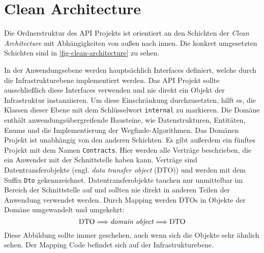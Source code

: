 \part{Clean Architecture}
Die Ordnerstruktur des API Projekts ist orientiert an den Schichten
der \textit{Clean Architecture}
mit Abhän\-gigkeiten von außen nach innen. Die konkret umgesetzten Schichten
sind in \autoref{fig-clean-architecture} zu sehen.



\noindent
In der Anwendungsebene werden hauptsächlich Interfaces definiert, welche
durch die Infrastrukturebene implementiert werden. Das API Projekt
sollte ausschließlich diese Interfaces verwenden und nie direkt
ein Objekt der Infrastruktur instanziieren.
Um diese Einschränkung durchzusetzten, hilft es,
die Klassen dieser Ebene mit dem Schlüsselwort \texttt{internal} zu markieren.
Die Domäne enthält anwendungsübergreifende Bausteine, wie
Datenstrukturen, Entitäten, Enums und die Implementierung der Wegfinde-Algorith\-men.
Das Domänen Projekt ist unabhängig von den anderen Schichten.
Es gibt außerdem ein fünftes Projekt mit dem Namen \texttt{Contracts}. Hier
werden alle Verträge beschrieben, die ein Anwender mit der Schnittstelle
haben kann. Verträge sind Datentransferobjekte (engl. \textit{data transfer object} (DTO))
und werden mit dem Suffix \texttt{Dto} gekennzeichnet. Datentransferobjekte
tauchen nur unmittelbar im Bereich der Schnittstelle auf und
sollten nie direkt in anderen Teilen der Anwendung verwendet werden.
Durch Mapping werden DTOs in Objekte der Domäne umgewandelt und umgekehrt:
\begin{equation*}
  \text{DTO} \Longrightarrow \text{\textit{domain object}} \Longrightarrow \text{DTO}
\end{equation*}
Diese Abbildung sollte immer geschehen, auch wenn sich die Objekte
sehr ähnlich sehen. Der Mapping Code befindet sich auf der Infrastrukturebene.